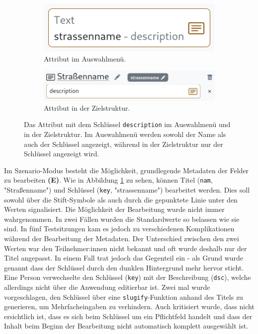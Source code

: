\begin{figure}[!ht]
  \centering
  \begin{subfigure}{.35\textwidth}
    \includegraphics[width=\linewidth]{assets/attribute-source.png}
    \caption{Attribut im Auswahlmenü.}
  \end{subfigure}
  \hspace{.05\textwidth}
  \begin{subfigure}{.55\textwidth}
    \includegraphics[width=\linewidth]{assets/attribute-target.png}
    \caption{Attribut in der Zielstruktur.}
    \label{fig:attribute-target}
  \end{subfigure}
    \caption[Ein Attribut im Auswahlmenü und in der  Zielstruktur]{Das Attribut mit dem Schlüssel \texttt{description} im Auswahlmenü und in der  Zielstruktur. Im Auswahlmenü werden sowohl der Name als auch der Schlüssel angezeigt, während in der Zielstruktur nur der Schlüssel angezeigt wird.}
    \label{fig:attribute-source-target}
\end{figure}

Im Szenario-Modus besteht die Möglichkeit, grundlegende Metadaten der Felder zu bearbeiten \textbf{(E)}. Wie in Abbildung \ref{fig:attribute-target} zu sehen, können Titel (\texttt{nam}, "Straßenname") und Schlüssel (\texttt{key}, "strassenname") bearbeitet werden. Dies soll sowohl über die Stift-Symbole als auch durch die gepunktete Linie unter den Werten signalisiert. Die Möglichkeit der Bearbeitung wurde nicht immer wahrgenommen. In zwei Fällen wurden die Standardwerte so belassen wie sie sind. In fünf Testsitzungen kam es jedoch zu verschiedenen Komplikationen während der Bearbeitung der Metadaten. Der Unterschied zwischen den zwei Werten war den Teilnehmer:innen nicht bekannt und oft wurde deshalb nur der Titel angepasst. In einem Fall trat jedoch das Gegenteil ein - als Grund wurde genannt dass der Schlüssel durch den dunklen Hintergrund mehr hervor sticht. Eine Person verwechselte den Schlüssel (\texttt{key}) mit der Beschreibung (\texttt{dsc}), welche allerdings nicht über die Anwendung editierbar ist. Zwei mal wurde vorgeschlagen, den Schlüssel über eine \texttt{slugify}-Funktion anhand des Titels zu generieren, um Mehrfacheingaben zu verhindern. Auch kritisiert wurde, dass nicht ersichtlich ist, dass es sich beim Schlüssel um ein Pflichtfeld handelt und dass der Inhalt beim Beginn der Bearbeitung nicht automatisch komplett ausgewählt ist.

